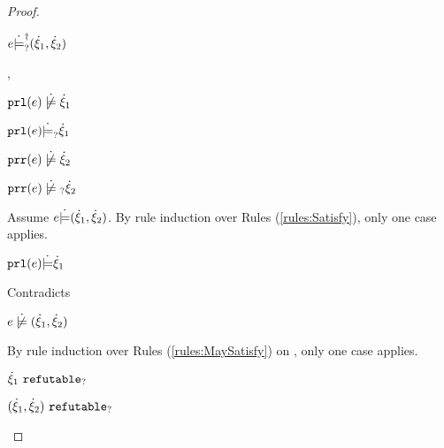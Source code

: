 \begin{proof}
\begin{byCases}
\begin{byCases}
\begin{byCases}
\begin{byCases}
\begin{pfsteps*}
                \item $e \dot{\models}_{?}^{\dag} (\dot{\xi}_1 , \dot{\xi}_2)$ 
                \end{pfsteps*}
            \end{byCases}
        \item[\cmaysatisfy{\hprl{e}}{\hxi_1},\cnotsatisfyormay{\hprr{e}}{\hxi_2}]
            \begin{pfsteps*}
            \item $\cnotsatisfy{\hprl{e}}{\hxi_1}$  
            \item $\mathtt{prl}(e) \dot{\models}_{?} \dot{\xi}_1$  
            \item $\cnotsatisfy{\hprr{e}}{\hxi_2}$  
            \item $\cnotmaysatisfy{\hprr{e}}{\hxi_2}$  
            \end{pfsteps*}
            Assume $e \dot{\models} (\dot{\xi}_1 , \dot{\xi}_2)$. By rule induction over Rules (\ref{rules:Satisfy}), only one case applies.
            \begin{byCases}
            \item[\text{(\ref{rule:CSNotIntroPair})}]
                \begin{pfsteps*}
                \item $\mathtt{prl}(e) \dot{\models} \dot{\xi}_1$ 
                \end{pfsteps*}
                Contradicts 
            \end{byCases}
            \begin{pfsteps*}
            \item $\cnotsatisfy{e}{\cpair{\hxi_1}{\hxi_2}}$  
            \end{pfsteps*}
            By rule induction over Rules (\ref{rules:MaySatisfy}) on , only one case applies. 
            \begin{byCases}
            \item[\text{(\ref{rule:CMSNotIntro})}]
                \begin{pfsteps*}
                \item $\dot{\xi}_1 ~\mathtt{refutable}_?$  
                \item $(\dot{\xi}_1 , \dot{\xi}_2) ~\mathtt{refutable}_?$  

\end{pfsteps*}
\end{byCases}
\end{byCases}
\end{byCases}
\end{byCases}
\end{proof}
